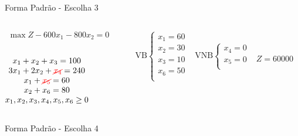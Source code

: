 \begin{frame}
{\begin{block}{Forma Padrão - {\color{cyan}Escolha 3}}
			\begin{columns}
				\begin{column}{0.35\textwidth}
					$
						\begin{matrix}
							\max Z - 600x_1 - 800x_2 = 0 \\
						\end{matrix}
					$ \\
					 \\
					$
						\begin{matrix}
							x_1  + x_2  + x_3                   = 100 \\
							3x_1 + 2x_2       + {\color{red}\cancel{x_4}}             = 240 \\
							x_1                     + {\color{red}\cancel{x_5}}       = 60 \\
							x_2                           + x_6 = 80 \\
							x_1,x_2, x_3, x_4, x_5, x_6 \ge 0 \\
						\end{matrix}
					$
				\end{column}
				\vline
				\hspace{0.1cm}
				\begin{column}{0.45\textwidth}
						$
							\begin{matrix}
								\text{VB} \left\{  \begin{matrix}
																 x_1 = 60 \\
																 x_2 = 30 \\
																 x_3 = 10 \\
																 x_6 = 50 \\
												   \end{matrix} 
										   \right.
								&
								\text{VNB} \left\{  \begin{matrix}
																 x_4 = 0 \\
																 x_5 = 0 \\
												   \end{matrix} 
										   \right. 
								\\
							 & \\
							\end{matrix}
						$
						{\color{red}$ Z = 60000 $}
				\end{column}
			\end{columns}
		\end{block}
	}
	{
		\begin{block}{Forma Padrão - {\color{cyan}Escolha 4}}

\end{block}}
\end{frame}
